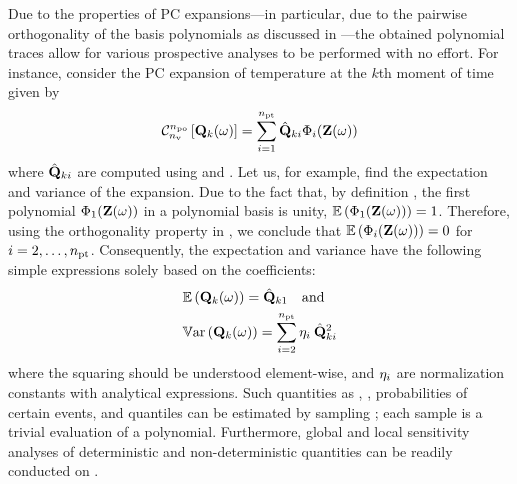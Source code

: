 Due to the properties of PC expansions---in particular, due to the pairwise orthogonality of the basis polynomials as discussed in ---the obtained polynomial traces allow for various prospective analyses to be performed with no effort. For instance, consider the PC expansion of temperature at the $k$th moment of time given by
\begin{equation} \elabel{pc-k}
  \oPC{\nvars}{\pcorder}{\vTO_k(\o)} = \sum_{i = 1}^{\pcterms} \pcc{\vTO}_{ki} \pcb_i(\vZ(\o))
\end{equation}
where $\hat{\mathbf{Q}}_{ki}$ are computed using  and . Let us, for example, find the expectation and variance of the expansion.
Due to the fact that, by definition \cite{xiu2010}, the first polynomial $\Phi_1(\mathbf{Z}(\omega))$ in a polynomial basis is unity, $\mathbb{E}\left(\Phi_1(\mathbf{Z}(\omega))\right) = 1$.
Therefore, using the orthogonality property in , we conclude that $\mathbb{E}\left(\Phi_i(\mathbf{Z}(\omega))\right) = 0$ for $i = 2, \dotsc, {n_\text{pt}}$.
Consequently, the expectation and variance have the following simple expressions solely based on the coefficients:
\begin{equation} \elabel{pc-moments}
\begin{aligned}
  & \oExp{\vTO_k(\o)} = \pcc{\vTO}_{k1} \hspace{1em} \text{and} \\
  & \oVar{\vTO_k(\o)} = \sum_{i = 2}^{\pcterms} \pcn_i \: \pcc{\vTO}_{ki}^2
\end{aligned}
\end{equation}
where the squaring should be understood element-wise, and $\eta_i$ are normalization constants with analytical expressions. Such quantities as \cdfs, \pdfs, probabilities of certain events, and quantiles can be estimated by sampling ; each sample is a trivial evaluation of a polynomial. Furthermore, global and local sensitivity analyses of deterministic and non-deterministic quantities can be readily conducted on .
